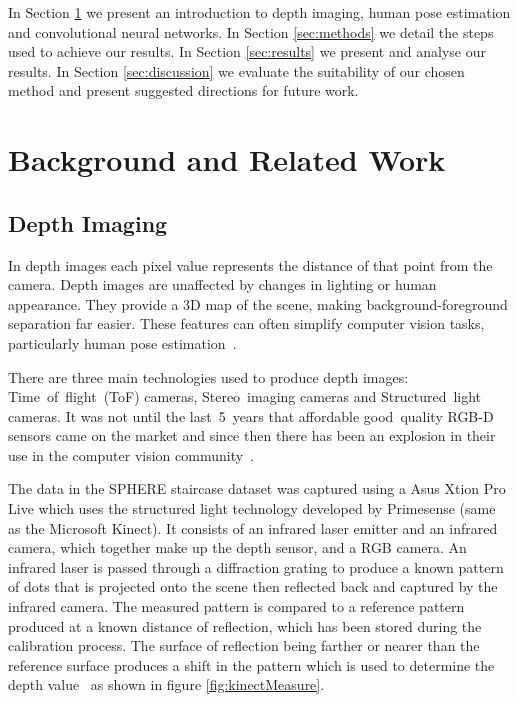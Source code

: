 \documentclass[11pt]{article} %
\begin{document}
In Section \ref{sec:bg} we present an introduction to depth imaging, human pose estimation and convolutional neural networks. In Section \ref{sec:methods} we detail the steps used to achieve our results. In Section \ref{sec:results} we present and analyse our results. In Section \ref{sec:discussion} we evaluate the suitability of our chosen method and present suggested directions for future work.






\section{Background and Related Work}
\label{sec:bg}
\subsection{Depth Imaging}
\label{sec:Depth}


In depth images each pixel value represents the distance of that point from the camera. Depth images are unaffected by changes in lighting or human appearance. They provide a 3D map of the scene, making background-foreground separation far easier. These features can often simplify computer vision tasks, particularly human pose estimation~\cite{Chen2013}.

There are three main technologies used to produce depth images: Time~of~flight~(ToF) cameras, Stereo~imaging cameras and Structured~light cameras. It was not until the last~5~years that affordable good~quality RGB-D sensors came on the market and since then there has been an explosion in their use in the computer vision community~\cite{Han2013}.

The data in the SPHERE staircase dataset was captured using a Asus Xtion Pro Live which uses the structured light technology developed by Primesense (same as the Microsoft Kinect). It consists of an infrared laser emitter and an infrared camera, which together make up the depth sensor, and a RGB camera. An infrared laser is passed through a diffraction grating to produce a known pattern of dots that is projected onto the scene then reflected back and captured by the infrared camera. The measured pattern is compared to a reference pattern produced at a known distance of reflection, which has been stored during the calibration process. The surface of reflection being farther or nearer than the reference surface produces a shift in the pattern which is used to determine the depth value~\cite{Zhang2012a,Khoshelham2012a} as shown in figure \ref{fig:kinectMeasure}.
\end{document}
